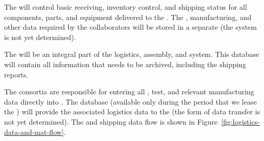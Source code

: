 The  will control basic receiving, inventory control, and shipping status for all components, parts, and equipment delivered to the .  %
 The ,  manufacturing, and other %
data required by the  collaborators will be stored in a separate  %
 (the system is not yet determined).  


The  will be an integral part of the logistics, assembly, and  system.%
This database will contain all information that needs to be archived, including the shipping reports. 

The consortia are responsible for entering all ,  %
test, and %
relevant manufacturing data directly into .  The  database (available only during the period that we lease the ) will provide the associated logistics data to the  (the form of data transfer is not yet determined).  The  and shipping data flow is shown in Figure~\ref{fig:logistics-data-and-mat-flow}.

